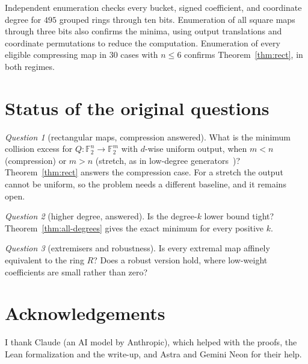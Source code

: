 \documentclass[11pt]{article}
\theoremstyle{definition}
\theoremstyle{remark}
\newtheorem{question}{Question}
\newcommand{\F}{\mathbb{F}_2}
\begin{document}
Independent enumeration checks every bucket, signed coefficient, and coordinate
degree for $495$ grouped rings through ten bits. Enumeration of all square maps
through three bits also confirms the minima, using output translations and
coordinate permutations to reduce the computation. Enumeration of every
eligible compressing map in $30$ cases with $n\le6$ confirms
Theorem~\ref{thm:rect}, in both regimes.


\section{Status of the original questions}

\begin{question}[rectangular maps, compression answered]
What is the minimum collision excess for $Q\colon\F^n\to\F^m$ with
$d$-wise uniform output, when $m<n$ (compression) or $m>n$ (stretch, as in
low-degree generators~\cite{MST06})? Theorem~\ref{thm:rect} answers the
compression case. For a stretch the output cannot be uniform, so the problem
needs a different baseline, and it remains open.
\end{question}

\begin{question}[higher degree, answered]
Is the degree-$k$ lower bound tight? Theorem~\ref{thm:all-degrees} gives the
exact minimum for every positive $k$.
\end{question}

\begin{question}[extremisers and robustness]
Is every extremal map affinely equivalent to the ring $R$? Does a robust version
hold, where low-weight coefficients are small rather than zero?
\end{question}

\section*{Acknowledgements}
I thank Claude (an AI model by Anthropic), which helped with the proofs, the
Lean formalization and the write-up, and Astra and Gemini Neon for their help.
\end{document}
